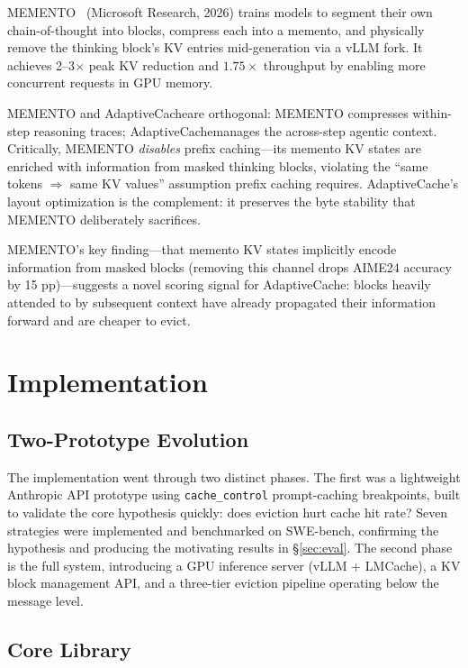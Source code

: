 \documentclass[letterpaper,twocolumn,10pt]{article}
\newcommand{\sysname}{AdaptiveCache}
\begin{document}
MEMENTO~\cite{kontonis2026memento} (Microsoft Research, 2026) trains models
to segment their own chain-of-thought into blocks, compress each into a
memento, and physically remove the thinking block's KV entries mid-generation
via a vLLM fork. It achieves 2--3$\times$ peak KV reduction and
$1.75\times$ throughput by enabling more concurrent requests in GPU memory.

MEMENTO and \sysname are orthogonal: MEMENTO compresses within-step
reasoning traces; \sysname manages the across-step agentic context. Critically,
MEMENTO \emph{disables} prefix caching---its memento KV states are enriched
with information from masked thinking blocks, violating the ``same tokens
$\Rightarrow$ same KV values'' assumption prefix caching requires.
\sysname's layout optimization is the complement: it preserves the byte
stability that MEMENTO deliberately sacrifices.

MEMENTO's key finding---that memento KV states implicitly encode information
from masked blocks (removing this channel drops AIME24 accuracy by 15
pp)---suggests a novel scoring signal for \sysname: blocks heavily attended
to by subsequent context have already propagated their information forward
and are cheaper to evict.

\section{Implementation}
\label{sec:impl}

\subsection{Two-Prototype Evolution}

The implementation went through two distinct phases. The first was a
lightweight Anthropic API prototype using \texttt{cache\_control}
prompt-caching breakpoints, built to validate the core hypothesis quickly:
does eviction hurt cache hit rate? Seven strategies were implemented and
benchmarked on SWE-bench, confirming the hypothesis and producing the
motivating results in \S\ref{sec:eval}. The second phase is the full
system, introducing a GPU inference server (vLLM + LMCache), a KV block
management API, and a three-tier eviction pipeline operating below the
message level.

\subsection{Core Library}
\end{document}

